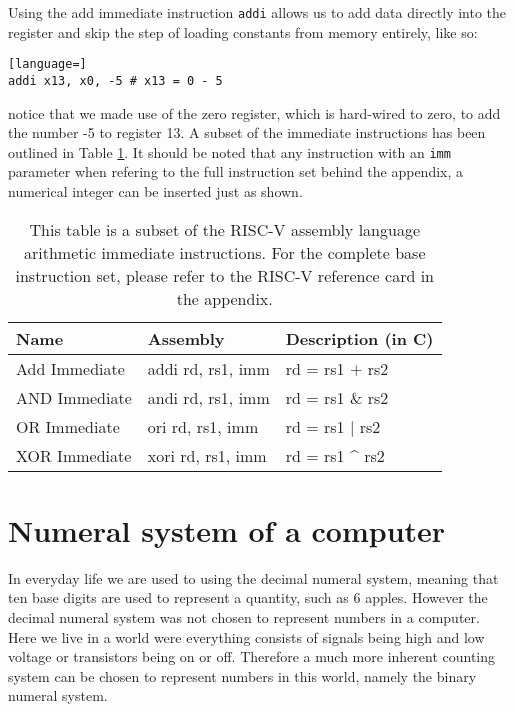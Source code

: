     Using the add immediate instruction \texttt{addi} allows us to add data directly into the register and skip the step of loading constants from memory entirely, like so:
    \begin{lstlisting}[language=]
addi x13, x0, -5 # x13 = 0 - 5
    \end{lstlisting}
    notice that we made use of the zero register, which is hard-wired to zero, to add the number -5 to register 13. A subset of the immediate instructions has been outlined in Table \ref{table:RISCVImmediateInstructions}. It should be noted that any instruction with an \texttt{imm} parameter when refering to the full instruction set behind the appendix, a numerical integer can be inserted just as shown.
    
    \begin{table}[h!]
        \centering
        \begin{tabular}{|l|l|l|}
        	\hline
        	Name          & Assembly          & Description (in C) \\ \hline
        	Add Immediate & addi rd, rs1, imm & rd = rs1 $+$ rs2   \\
        	AND Immediate & andi rd, rs1, imm & rd = rs1 \& rs2    \\
        	OR Immediate  & ori rd, rs1, imm  & rd = rs1 $|$ rs2   \\
        	XOR Immediate & xori rd, rs1, imm & rd = rs1 \^{} rs2  \\ \hline
        \end{tabular}
        \caption{This table is a subset of the RISC-V assembly language arithmetic immediate instructions. For the complete base instruction set, please refer to the RISC-V reference card in the appendix.}
        \label{table:RISCVImmediateInstructions}
    \end{table}
        
\section{Numeral system of a computer}
    In everyday life we are used to using the decimal numeral system, meaning that ten base digits are used to represent a quantity, such as 6 apples. However the decimal numeral system was not chosen to represent numbers in a computer. Here we live in a world were everything consists of signals being high and low voltage or transistors being on or off. Therefore a much more inherent counting system can be chosen to represent numbers in this world, namely the binary numeral system.
    
